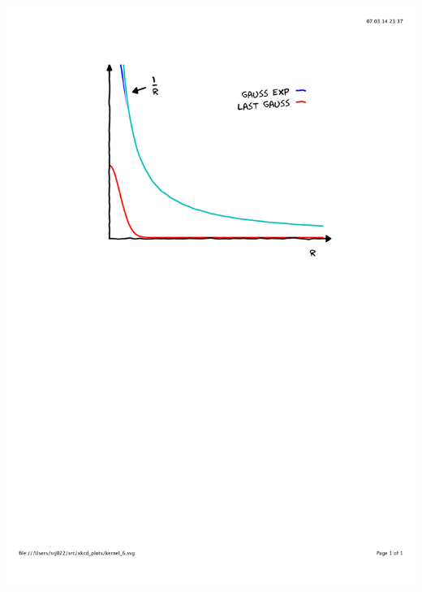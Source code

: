\begin{frame}
\begin{columns}
\begin{column}{.45\textwidth}
{        \includegraphics[scale=0.4, clip, viewport = 110 450 490 800] {figures/kernel_6.pdf}}
\end{column}
\end{columns}
\end{frame}
